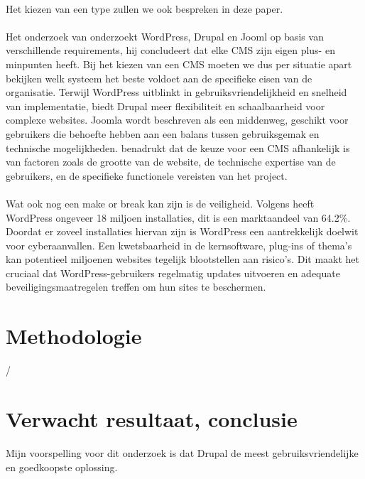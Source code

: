 \\
Het kiezen van een type zullen we ook bespreken in deze paper.
\\ \\
Het onderzoek van \textcite{Khalil2024} onderzoekt WordPress, Drupal en Jooml op basis van verschillende requirements, hij concludeert dat elke CMS zijn eigen plus- en minpunten heeft. Bij het kiezen van een CMS moeten we dus per situatie apart bekijken welk systeem het beste voldoet aan de specifieke eisen van de organisatie. Terwijl WordPress uitblinkt in gebruiksvriendelijkheid en snelheid van implementatie, biedt Drupal meer flexibiliteit en schaalbaarheid voor complexe websites. Joomla wordt beschreven als een middenweg, geschikt voor gebruikers die behoefte hebben aan een balans tussen gebruiksgemak en technische mogelijkheden. \textcite{Khalil2024} benadrukt dat de keuze voor een CMS afhankelijk is van factoren zoals de grootte van de website, de technische expertise van de gebruikers, en de specifieke functionele vereisten van het project.
\\ \\
Wat ook nog een make or break kan zijn is de veiligheid. Volgens \textcite{MarianVladut2021} heeft WordPress ongeveer 18 miljoen installaties, dit is een marktaandeel van 64.2\%. Doordat er zoveel installaties hiervan zijn is WordPress een aantrekkelijk doelwit voor cyberaanvallen. Een kwetsbaarheid in de kernsoftware, plug-ins of thema's kan potentieel miljoenen websites tegelijk blootstellen aan risico's. Dit maakt het cruciaal dat WordPress-gebruikers regelmatig updates uitvoeren en adequate beveiligingsmaatregelen treffen om hun sites te beschermen.




\section{Methodologie}%
\label{sec:methodologie}

/

\section{Verwacht resultaat, conclusie}%
\label{sec:verwachte_resultaten}

Mijn voorspelling voor dit onderzoek is dat Drupal de meest gebruiksvriendelijke en goedkoopste oplossing.